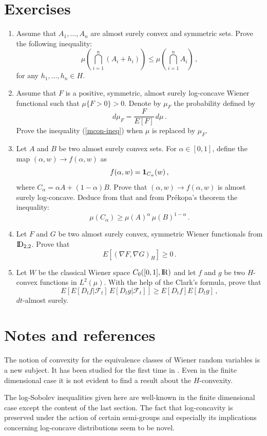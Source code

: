 \documentclass[12pt,a4paper]{book}
\newcommand{\F}{{\mathcal F}}
\renewcommand{\L}{{\mathcal L}}
\newcommand{\DD}{{\rm I\!D}}
\newcommand{\R}{{\rm I\!R}}
\newcommand{\dett}{{\textstyle{\det_2}}}
\newcommand{\won}{{\mbox{\bf 1}}}
\newcommand{\remark}{\noindent {\bf Remark:\ }}
\begin{document}
\section*{Exercises}
{\footnotesize{
\begin{enumerate}
\item Assume that $A_1,\ldots,A_n$ are almost surely convex and symmetric
sets. Prove the following inequality:
\begin{equation}
\label{mcon-ineq}
 \mu\left(\bigcap_{i=1}^n(A_i+h_i)\right)\leq
\mu\left(\bigcap_{i=1}^nA_i\right)\,,
\end{equation}
for any $h_1,\ldots,h_n\in H$.
\item Assume that $F$ is a positive,  symmetric, almost surely log-concave
Wiener functional such that $\mu\{F>0\}>0$. Denote by $\mu_F$ the
probability defined by
$$
d\mu_F=\frac{F}{E[F]}\,d\mu\,.
$$
Prove the inequality (\ref{mcon-ineq}) when $\mu$ is replaced by
$\mu_F$.
\item Let $A$ and $B$ be two almost surely convex sets. For
$\alpha\in [0,1]$, define the map $(\alpha,w)\to f(\alpha,w)$ as
$$
f(\alpha,w)=\won_{C_\alpha}(w)\,,
$$
where $C_\alpha=\alpha A+(1-\alpha)B$. Prove that $(\alpha,w)\to
f(\alpha,w)$ is almost surely log-concave. Deduce from that and
from Pr\'ekopa's theorem the inequality:
$$
\mu(C_\alpha)\geq \mu(A)^\alpha\,\mu(B)^{1-\alpha}\,.
$$
\item Let $F$ and $G$ be two almost surely convex, symmetric
Wiener functionals from $\DD_{2,2}$. Prove that
$$
E[(\nabla F,\nabla G)_H]\geq 0\,.
$$
\item Let $W$ be the classical Wiener space $C_0([0,1],\R)$ and let
  $f$ and $g$ be two $H$-convex functions in $L^2(\mu)$. With the help
  of the Clark's formula, prove that 
$$
E[E[D_tf|\F_t]\,E[D_tg|\F_t]]\geq E[D_tf]E[D_tg]\,,
$$
$dt$-almost surely.
\end{enumerate}


}}


\section*{Notes and references}
{\footnotesize{ The notion of convexity for the equivalence
classes of Wiener random variables is a new subject. It has been
studied for the first time in \cite{F-U}. Even in the finite
dimensional case it is not evident to find a result about the
$H$-convexity.



The log-Sobolev inequalities given here are well-known in the
finite dimensional case except the content of the last section.
The fact that log-concavity is preserved under the action of
certain semi-groups and especially its implications
concerning log-concave distributions  seem to be  novel.





}}
\end{document}
